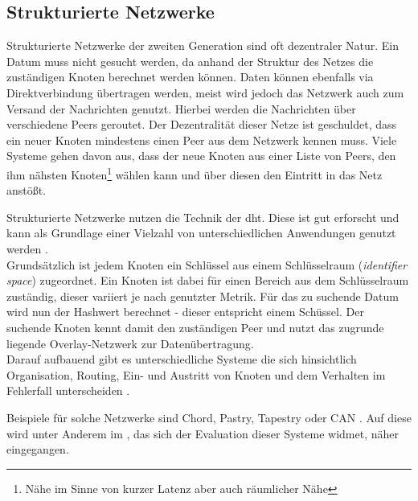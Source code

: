 \subsection{Strukturierte Netzwerke}
Strukturierte Netzwerke der zweiten Generation sind oft dezentraler Natur. Ein Datum muss nicht gesucht werden, da anhand der Struktur des Netzes die zuständigen Knoten berechnet werden können. Daten können ebenfalls via Direktverbindung übertragen werden, meist wird jedoch das Netzwerk auch zum Versand der Nachrichten genutzt. Hierbei werden die Nachrichten über verschiedene Peers geroutet. Der Dezentralität dieser Netze ist geschuldet, dass ein neuer Knoten mindestens einen Peer aus dem Netzwerk kennen muss. Viele Systeme gehen davon aus, dass der neue Knoten aus einer Liste von Peers, den ihm nähsten Knoten\footnote{Nähe im Sinne von kurzer Latenz aber auch räumlicher Nähe} wählen kann und über diesen den Eintritt in das Netz anstößt.

Strukturierte Netzwerke nutzen die Technik der \ac{dht}. Diese ist gut erforscht und kann als Grundlage einer Vielzahl von unterschiedlichen Anwendungen genutzt werden \cite{Wehrle2005, Ghodsi2006AlgorithmsDHT}.\\
Grundsätzlich ist jedem Knoten ein Schlüssel aus einem Schlüsselraum (\emph{identifier space}) zugeordnet. Ein Knoten ist dabei für einen Bereich aus dem Schlüsselraum zuständig, dieser variiert je nach genutzter Metrik. Für das zu suchende Datum wird nun der Hashwert berechnet - dieser entspricht einem Schüssel. Der suchende Knoten kennt damit den zuständigen Peer und nutzt das zugrunde liegende Overlay-Netzwerk zur Datenübertragung.\\
Darauf aufbauend gibt es unterschiedliche Systeme die sich hinsichtlich Organisation, Routing, Ein- und Austritt von Knoten und dem Verhalten im Fehlerfall unterscheiden \cite{Goetz2005, Lua2005Survey}.

Beispiele für solche Netzwerke sind Chord, Pastry, Tapestry oder CAN \cite{Hosseini2007Survey, Rowstron2001, Zhao2001Tapestry,Zhao2004Tapestry, Ratnasamy2001Scalable}. Auf diese wird unter Anderem im , das sich der Evaluation dieser Systeme widmet, näher eingegangen.

